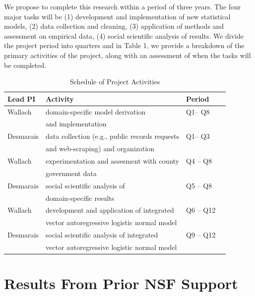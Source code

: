 We propose to complete this research within a period of three years. The four major tasks will be (1) development and implementation of new statistical models, (2) data collection and cleaning, (3) application of methods and assessment on empirical data, (4) social scientific analysis of results. We divide the project period into quarters and in Table 1, we provide a breakdown of the primary activities of the project, along with an assessment of when the tasks will be completed.
\vspace{-.25cm}

\begin{table}[h]
\caption{Schedule of Project Activities}
\begin{center}
\begin{tabular}{|l|l|l|l|}
\hline
{\bf Lead PI} & {\bf Activity} & {\bf Period} \\ \hline
Wallach & domain-specific model derivation   &   Q1-- Q8 \\
& and implementation &  \\ \hline
Desmarais & data collection (e.g., public records requests  & Q1-- Q3 \\
&  and web-scraping)  and organization & \\ \hline
Wallach & experimentation and assesment with county & Q4 -- Q8 \\
&  government data & \\ \hline
Desmarais & social scientific analysis  of & Q5 -- Q8 \\
& domain-specific results & \\ \hline
Wallach & development and application of integrated & Q6 -- Q12 \\
& vector autoregressive logistic normal model & \\ \hline
Desmarais & social scientific analysis of integrated & Q9 -- Q12 \\
& vector autoregressive logistic normal model & \\ \hline

\end{tabular}
\end{center}
\label{schedule}
\end{table}%


\vspace{-1cm}

\section{Results From Prior NSF Support}   \vspace{-.2cm}

